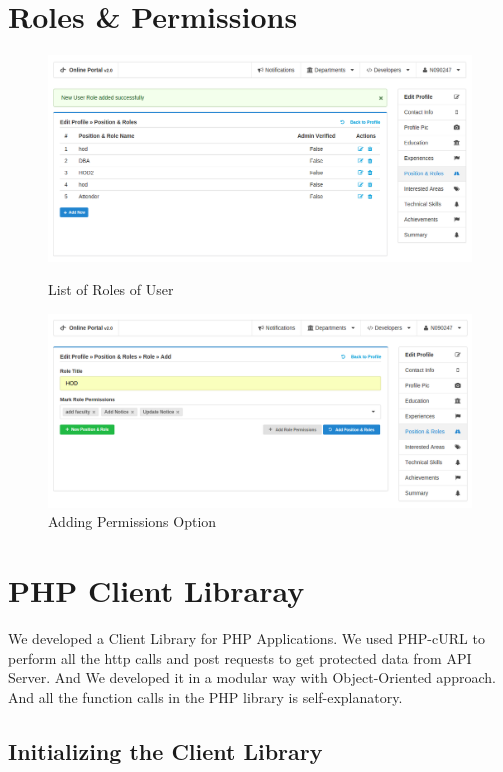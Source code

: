 \documentclass[12pt]{report}
\begin{document}
\section{Roles \& Permissions}
\begin{figure}[H]
\begin{center}
\includegraphics[scale=0.4]{RID_Pics/Roles}
\caption{List of Roles of User\label{fig:User Roles}}
\end{center}

\begin{center}
\includegraphics[scale=0.4]{RID_Pics/Add_Permission}
\caption{Adding Permissions Option\label{fig:Add Permissions}}
\end{center}
\end{figure}
\pagebreak
\section{PHP Client Libraray}
\hspace{6mm}  We developed a Client Library for PHP Applications. We used PHP-cURL to perform all the http calls and post requests to get protected data from API Server. And We developed it in a modular way with Object-Oriented approach. And all the function calls in the PHP library is self-explanatory.
\subsection{Initializing the Client Library}

\end{document}
